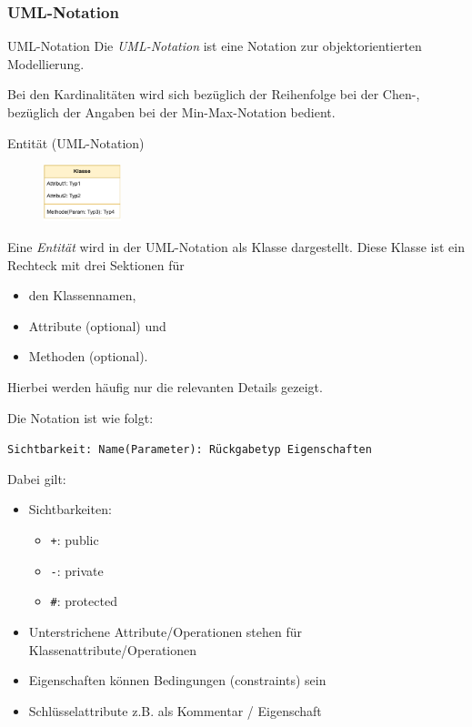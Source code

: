 \newpage
\subsubsection{UML-Notation}

\begin{defi}{UML-Notation}
    Die \emph{UML-Notation} ist eine Notation zur objektorientierten Modellierung.

    Bei den Kardinalitäten wird sich bezüglich der Reihenfolge bei der Chen-, bezüglich der Angaben bei der Min-Max-Notation bedient.
\end{defi}

\begin{defi}{Entität (UML-Notation)}
    \begin{figure}
        \begin{center}
            \includegraphics[width=0.2\textwidth]{includes/figures/definition_uml_entity.pdf}
        \end{center}
    \end{figure}
    Eine \emph{Entität} wird in der UML-Notation als Klasse dargestellt.
    Diese Klasse ist ein Rechteck mit drei Sektionen für
    \begin{itemize}
        \item den Klassennamen,
        \item Attribute (optional) und
        \item Methoden (optional).
    \end{itemize}
    Hierbei werden häufig nur die relevanten Details gezeigt.

    Die Notation ist wie folgt:
    \begin{center}
        \texttt{Sichtbarkeit: Name(Parameter): Rückgabetyp {Eigenschaften}}
    \end{center}

    Dabei gilt:
    \begin{itemize}
        \item Sichtbarkeiten:
              \begin{itemize}
                  \item \texttt{+}: public
                  \item \texttt{-}: private
                  \item \texttt{\#}: protected
              \end{itemize}
        \item Unterstrichene Attribute/Operationen stehen für Klassenattribute/Operationen
        \item Eigenschaften können Bedingungen (constraints) sein
        \item Schlüsselattribute z.B. als Kommentar / Eigenschaft
    \end{itemize}
\end{defi}

